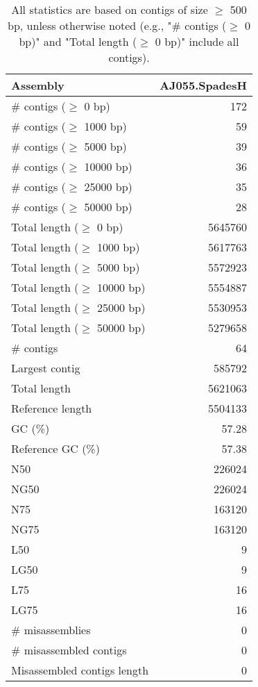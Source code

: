 \documentclass[12pt,a4paper]{article}
\begin{document}
\begin{table}[ht]
\begin{center}
\caption{All statistics are based on contigs of size $\geq$ 500 bp, unless otherwise noted (e.g., "\# contigs ($\geq$ 0 bp)" and "Total length ($\geq$ 0 bp)" include all contigs).}
\begin{tabular}{|l*{1}{|r}|}
\hline
Assembly & AJ055.SpadesH \\ \hline
\# contigs ($\geq$ 0 bp) & 172 \\ \hline
\# contigs ($\geq$ 1000 bp) & 59 \\ \hline
\# contigs ($\geq$ 5000 bp) & 39 \\ \hline
\# contigs ($\geq$ 10000 bp) & 36 \\ \hline
\# contigs ($\geq$ 25000 bp) & 35 \\ \hline
\# contigs ($\geq$ 50000 bp) & 28 \\ \hline
Total length ($\geq$ 0 bp) & 5645760 \\ \hline
Total length ($\geq$ 1000 bp) & 5617763 \\ \hline
Total length ($\geq$ 5000 bp) & 5572923 \\ \hline
Total length ($\geq$ 10000 bp) & 5554887 \\ \hline
Total length ($\geq$ 25000 bp) & 5530953 \\ \hline
Total length ($\geq$ 50000 bp) & 5279658 \\ \hline
\# contigs & 64 \\ \hline
Largest contig & 585792 \\ \hline
Total length & 5621063 \\ \hline
Reference length & 5504133 \\ \hline
GC (\%) & 57.28 \\ \hline
Reference GC (\%) & 57.38 \\ \hline
N50 & 226024 \\ \hline
NG50 & 226024 \\ \hline
N75 & 163120 \\ \hline
NG75 & 163120 \\ \hline
L50 & 9 \\ \hline
LG50 & 9 \\ \hline
L75 & 16 \\ \hline
LG75 & 16 \\ \hline
\# misassemblies & 0 \\ \hline
\# misassembled contigs & 0 \\ \hline
Misassembled contigs length & 0 \\ \hline

\end{tabular}
\end{center}
\end{table}
\end{document}
